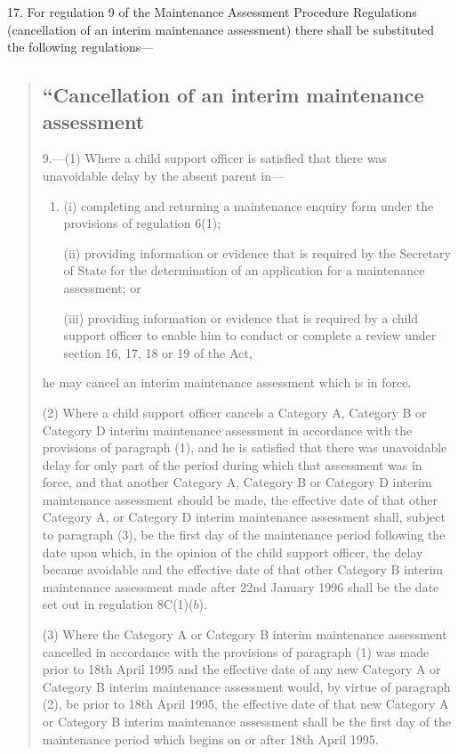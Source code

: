 \documentclass[a4paper]{article}
\begin{document}
17.  For regulation 9 of the Maintenance Assessment Procedure Regulations (cancellation of an interim maintenance assessment) there shall be substituted the following regulations—
\begin{quotation}
\subsection*{“Cancellation of an interim maintenance assessment}

9.—(1) Where a child support officer is satisfied that there was unavoidable delay by the absent parent in—
\begin{enumerate}\item[]
(i) completing and returning a maintenance enquiry form under the provisions of regulation 6(1);

(ii) providing information or evidence that is required by the Secretary of State for the determination of an application for a maintenance assessment; or

(iii) providing information or evidence that is required by a child support officer to enable him to conduct or complete a review under section 16, 17, 18 or 19 of the Act,
\end{enumerate}
he may cancel an interim maintenance assessment which is in force.

(2) Where a child support officer cancels a Category A, Category B or Category D interim maintenance assessment in accordance with the provisions of paragraph (1), and he is satisfied that there was unavoidable delay for only part of the period during which that assessment was in force, and that another Category A, Category B or Category D interim maintenance assessment should be made, the effective date of that other Category A, or Category D interim maintenance assessment shall, subject to paragraph (3), be the first day of the maintenance period following the date upon which, in the opinion of the child support officer, the delay became avoidable and the effective date of that other Category B interim maintenance assessment made after 22nd January 1996 shall be the date set out in regulation 8C(1)($b$).

(3) Where the Category A or Category B interim maintenance assessment cancelled in accordance with the provisions of paragraph (1) was made prior to 18th April 1995 and the effective date of any new Category A or Category B interim maintenance assessment would, by virtue of paragraph (2), be prior to 18th April 1995, the effective date of that new Category A or Category B interim maintenance assessment shall be the first day of the maintenance period which begins on or after 18th April 1995.


\end{quotation}
\end{document}
